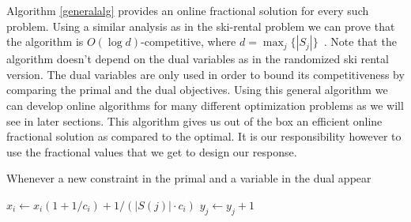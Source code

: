 Algorithm \ref{generalalg} provides an online fractional solution for every such problem. Using a similar analysis as in the ski-rental problem we can prove that the algorithm is $O(\log d)$-competitive, where \mbox{$d = \max_j\{|S_j|\}$}~\cite{buchbinder09:survey}.
Note that the algorithm doesn't depend on the dual variables as in the randomized ski rental version. The dual variables are only used in order to bound its competitiveness by comparing the primal and the dual objectives.
Using this general algorithm we can develop online algorithms for many different optimization problems as we will see in later sections. This algorithm gives us out of the box an efficient online fractional solution as compared to the optimal. It is our responsibility however to use the fractional values that we get to design our response.

\begin{algorithm}
\label{generalalg}
\caption{Whenever a new constraint in the primal and a variable in the dual appear}
\begin{algorithmic}[1]
    \STATE $x_i \leftarrow x_i (1 + 1/c_i) + 1/(|S(j)| \cdot c_i)$ 
  \ENDFOR
  \STATE $y_j \leftarrow y_j + 1$
\ENDWHILE
\end{algorithmic}
\end{algorithm}


